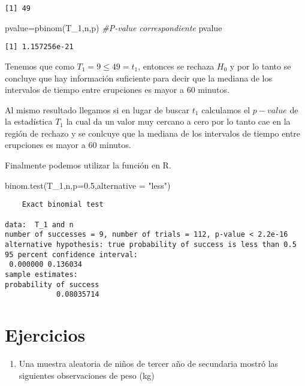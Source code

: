 \documentclass[
  a4paper,
  oneside,
  openany]{book}
\newenvironment{Shaded}{\begin{snugshade}}{\end{snugshade}}
\newcommand{\AttributeTok}[1]{\textcolor[rgb]{0.77,0.63,0.00}{#1}}
\newcommand{\CommentTok}[1]{\textcolor[rgb]{0.56,0.35,0.01}{\textit{#1}}}
\newcommand{\FloatTok}[1]{\textcolor[rgb]{0.00,0.00,0.81}{#1}}
\newcommand{\FunctionTok}[1]{\textcolor[rgb]{0.00,0.00,0.00}{#1}}
\newcommand{\NormalTok}[1]{#1}
\newcommand{\OtherTok}[1]{\textcolor[rgb]{0.56,0.35,0.01}{#1}}
\newcommand{\StringTok}[1]{\textcolor[rgb]{0.31,0.60,0.02}{#1}}
\providecommand{\tightlist}{%
  \setlength{\itemsep}{0pt}\setlength{\parskip}{0pt}}
\begin{document}
\begin{verbatim}
[1] 49
\end{verbatim}

\begin{Shaded}
\begin{Highlighting}[]
\NormalTok{pvalue}\OtherTok{=}\FunctionTok{pbinom}\NormalTok{(T\_1,n,p)     }\CommentTok{\#P{-}value correspondiente}
\NormalTok{pvalue}
\end{Highlighting}
\end{Shaded}

\begin{verbatim}
[1] 1.157256e-21
\end{verbatim}

Tenemos que como \(T_1=9\leq 49 =t_1\), entonces se rechaza \(H_0\) y por lo tanto se concluye que hay información suficiente para decir que la mediana de los intervalos de tiempo entre erupciones es mayor a 60 minutos.

Al mismo resultado llegamos si en lugar de buscar \(t_1\) calculamos el \(p-value\) de la estadística \(T_1\) la cual da un valor muy cercano a cero por lo tanto cae en la región de rechazo y se conlcuye que la mediana de los intervalos de tiempo entre erupciones es mayor a 60 minutos.

Finalmente podemos utilizar la función en R.

\begin{Shaded}
\begin{Highlighting}[]
\FunctionTok{binom.test}\NormalTok{(T\_1,n,}\AttributeTok{p=}\FloatTok{0.5}\NormalTok{,}\AttributeTok{alternative =} \StringTok{"less"}\NormalTok{)}
\end{Highlighting}
\end{Shaded}

\begin{verbatim}
    Exact binomial test

data:  T_1 and n
number of successes = 9, number of trials = 112, p-value < 2.2e-16
alternative hypothesis: true probability of success is less than 0.5
95 percent confidence interval:
 0.000000 0.136034
sample estimates:
probability of success 
            0.08035714 
\end{verbatim}

\hypertarget{ejercicios-1}{%
\section{Ejercicios}\label{ejercicios-1}}

\begin{enumerate}
\def\labelenumi{\arabic{enumi}.}
\tightlist
\item
  Una muestra aleatoria de niños de tercer año de secundaria mostró las siguientes observaciones de peso (kg)
\end{enumerate}
\end{document}
